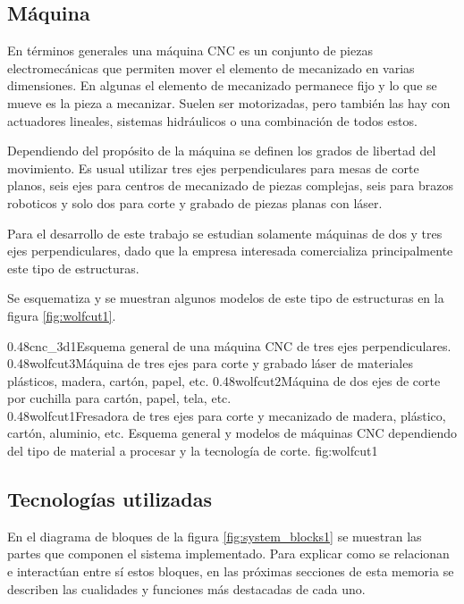 \subsection{Máquina}
En términos generales una máquina CNC es un conjunto de piezas electromecánicas que permiten mover el elemento de mecanizado en varias dimensiones.
En algunas el elemento de mecanizado permanece fijo y lo que se mueve es la pieza a mecanizar.
Suelen ser motorizadas, pero también las hay con actuadores lineales, sistemas hidráulicos o una combinación de todos estos.\par
Dependiendo del propósito de la máquina se definen los grados de libertad del movimiento.
Es usual utilizar tres ejes perpendiculares para mesas de corte planos, seis ejes para centros de mecanizado de piezas complejas, seis para brazos roboticos y solo dos para corte y grabado de piezas planas con láser.\par
Para el desarrollo de este trabajo se estudian solamente máquinas de dos y tres ejes perpendiculares, dado que la empresa interesada comercializa principalmente este tipo de estructuras. \par
Se esquematiza y se muestran algunos modelos de este tipo de estructuras en la figura \ref{fig:wolfcut1}.

\subfigtwotwo
{0.48}{cnc_3d1}{Esquema general de una máquina CNC de tres ejes perpendiculares.\\ \vphantom{1}}
            {0.48}{wolfcut3}{Máquina de tres ejes para corte y grabado láser de materiales plásticos, madera, cartón, papel, etc.}
            {0.48}{wolfcut2}{Máquina de dos ejes de corte por cuchilla para cartón, papel, tela, etc.\\ \vphantom{1}}
            {0.48}{wolfcut1}{Fresadora de tres ejes para corte y mecanizado de madera, plástico, cartón, aluminio, etc.}
            {Esquema general y modelos de máquinas CNC dependiendo del tipo de material a procesar y la tecnología de corte.}
            {fig:wolfcut1}


\subsection{Tecnologías utilizadas}
   En el diagrama de bloques de la figura \ref{fig:system_blocks1} se muestran las partes que componen el sistema implementado.
   Para explicar como se relacionan e interactúan entre sí estos bloques, en las próximas secciones de esta memoria se describen las cualidades y funciones más destacadas de cada uno.

